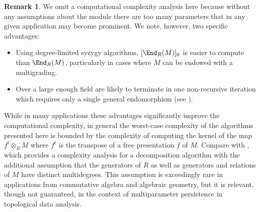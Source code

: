 \documentclass[12pt]{amsart}
\def\cF{\mathcal F}
\def\OO{\mathcal O}
\let\inc\hookrightarrow
\theoremstyle{theorem}
\numberwithin{thm}{section}
\newtheorem{lem}[thm]{Lemma}
\theoremstyle{definition}
\newtheorem{rem}[thm]{Remark}
\newcommand{\mahrud}[1]{{\color{ForestGreen} \sf $\blacklozenge$ Mahrud: [#1]}}
\begin{document}




\begin{rem}\label{rem:complexity}
  We omit a computational complexity analysis here because without any assumptions about the module there are too many parameters that in any given application may become prominent. We note, however, two specific advantages:
  \begin{itemize}[topsep=6pt,itemsep=0pt]
  \item Using degree-limited syzygy algorithms, $[\End_R(M)]_0$ is easier to compute than $\End_R(M)$, particularly in cases where $M$ can be endowed with a multigrading.
  \item Over a large enough field  are likely to terminate in one non-recursive iteration which requires only a single general endomorphism (see ).
  \end{itemize}
   While in many applications these advantages significantly improve the computational complexity, in general the worst-case complexity of the algorithms presented here is bounded by the complexity of computing the kernel of the map $f^t\otimes_R M$ where $f^t$ is the transpose of a free presentation $f$ of $M$. Compare with \cite{DX22}, which provides a complexity analysis for a decomposition algorithm with the additional assumption that the generators of $R$ as well as generators and relations of $M$ have distinct multidegrees. This assumption is exceedingly rare in applications from commutative algebra and algebraic geometry, but it is relevant, though not guaranteed, in the context of multiparameter persistence in topological data analysis.
\end{rem}
\end{document}
